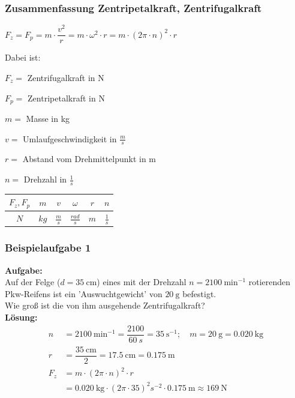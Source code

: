 \documentclass{beamer}
\begin{document}
\frame
{
  \frametitle{Zusammenfassung Zentripetalkraft, Zentrifugalkraft}
  \begin{theorem}
  $F_z=F_p=m\cdot\dfrac{v^{2}}{r}=m\cdot\omega^{2}\cdot r=m\cdot (2\pi\cdot n)^{2}\cdot r$
  \end{theorem}
  Dabei ist:
  \begin{description}
  \item $F_z=$ Zentrifugalkraft in N
  \item $F_p=$ Zentripetalkraft in N
  \item $m=$ Masse in kg
  \item $v=$ Umlaufgeschwindigkeit in $\frac{m}{s}$
  \item $r=$ Abstand vom Drehmittelpunkt in m
  \item $n=$ Drehzahl in $\frac{1}{s}$
  \end{description}
  \begin{tabular}{c|c|c|c|c|c}
  $F_z, F_p$ & $m$ & $v$ & $\omega$ & $r$ & $n$ \\ 
  \hline 
  $N$ & $kg$ & $\frac{m}{s}$ & $\frac{rad}{s}$ & $m$ & $\frac{1}{s}$ \\ 
  \end{tabular} 
}

\frame
{
\frametitle{Beispielaufgabe 1}
{
\textbf{Aufgabe:}\\
Auf der Felge ($d=\SI{35}{\centi\meter}$) eines mit der Drehzahl $n=\SI{2100}{\minute^{-1}}$ rotierenden Pkw-Reifens ist ein 'Auswuchtgewicht' von $\SI{20}{\gram}$ befestigt.\\
Wie groß ist die von ihm ausgehende Zentrifugalkraft?\\
}
{
\textbf{Lösung:}\\
\begin{align*}
n&=\SI{2100}{\minute^{-1}}=\dfrac{2100}{\SI{60}{s}}=\SI{35}{\second^{-1}};\quad m=\SI{20}{\gram}=\SI{0.020}{\kilo\gram}\\
r&=\dfrac{\SI{35}{\centi\meter}}{2}=\SI{17.5}{\centi\meter}=\SI{0.175}{\meter}\\
F_z&=m\cdot (2\pi\cdot n)^{2}\cdot r\\
&=\SI{0.020}{\kilo\gram}\cdot (2\pi\cdot 35)^{2}s^{-2}\cdot \SI{0.175}{\meter}\approx\SI{169}{\newton}\\
\end{align*}
}
}
\end{document}
